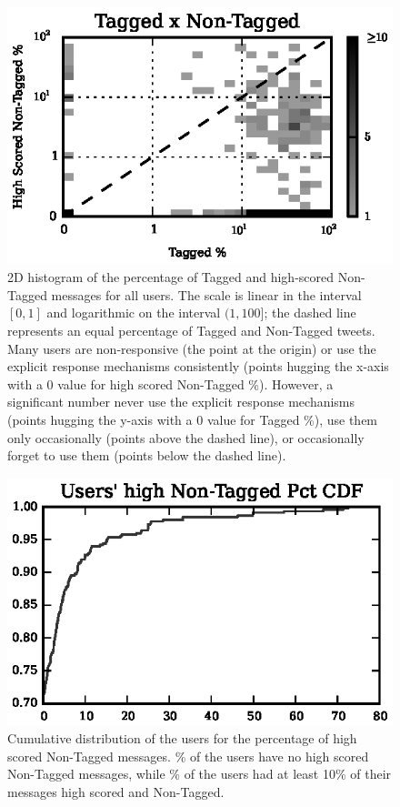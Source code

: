 \begin{figure}[!tb]
\centering
\includegraphics[scale=1.2]{./figures/user_alltagged_highnontagged_2dhist_0375.eps}
\caption{2D histogram of the percentage of Tagged and high-scored Non-Tagged messages for all users. The scale is linear in the interval $[0,1]$ and logarithmic on the interval $(1,100]$; the dashed line represents an equal percentage of Tagged and Non-Tagged tweets. 
Many users are non-responsive (the point at the origin) or use the explicit response mechanisms consistently (points hugging the x-axis with a 0 value for high scored Non-Tagged \%).  However, a significant number never use the explicit response mechanisms (points hugging the y-axis with a 0 value for Tagged \%), use them only occasionally (points above the dashed line), or occasionally forget to use them (points below the dashed line).}
\label{fig:2d_histogram}
\end{figure}


\begin{figure}[!tb]
\centering
\includegraphics[scale=1]{./figures/users_high_nontagged_pct_cdf.eps}
\caption{Cumulative distribution of the users for the percentage of high scored Non-Tagged messages. \usersZeroHighScoredPct{}\% of the users have no high scored Non-Tagged messages, while \usersMoreThanTenPctPct{}\% of the users had at least 10\% of their messages high scored and Non-Tagged.}
\label{fig:cumulative_user}
\end{figure}


